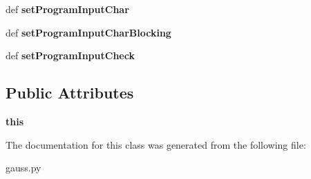 \begin{DoxyCompactItemize}
\item 
\hypertarget{classgauss_1_1_g_a_u_s_s_a559c90842d998458431f1a441cdb7b64}{def {\bfseries set\-Program\-Input\-Char}}\label{classgauss_1_1_g_a_u_s_s_a559c90842d998458431f1a441cdb7b64}

\item 
\hypertarget{classgauss_1_1_g_a_u_s_s_a807f6de227909425a4525a15f1fc5aab}{def {\bfseries set\-Program\-Input\-Char\-Blocking}}\label{classgauss_1_1_g_a_u_s_s_a807f6de227909425a4525a15f1fc5aab}

\item 
\hypertarget{classgauss_1_1_g_a_u_s_s_a52abc1657a8abf7fa811d44c980d6b4b}{def {\bfseries set\-Program\-Input\-Check}}\label{classgauss_1_1_g_a_u_s_s_a52abc1657a8abf7fa811d44c980d6b4b}

\end{DoxyCompactItemize}
\subsection*{Public Attributes}
\begin{DoxyCompactItemize}
\item 
\hypertarget{classgauss_1_1_g_a_u_s_s_a080099605b27c8fd63e629ce3b1b3a9e}{{\bfseries this}}\label{classgauss_1_1_g_a_u_s_s_a080099605b27c8fd63e629ce3b1b3a9e}

\end{DoxyCompactItemize}


The documentation for this class was generated from the following file\-:\begin{DoxyCompactItemize}
\item 
gauss.\-py\end{DoxyCompactItemize}
